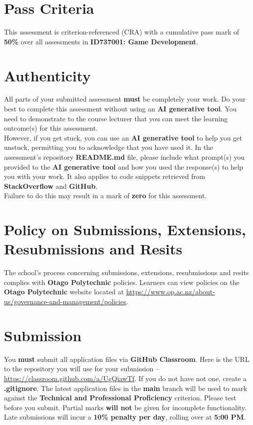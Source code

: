 \documentclass{article}
\begin{document}
\section*{Pass Criteria}
This assessment is criterion-referenced (CRA) with a cumulative pass mark of \textbf{50\%} over all assessments in \textbf{ID737001: Game Development}.

\section*{Authenticity}
All parts of your submitted assessment \textbf{must} be completely your work. Do your best to complete this assessment without using an \textbf{AI generative tool}. You need to demonstrate to the course lecturer that you can meet the learning outcome(s) for this assessment. \\
 
 However, if you get stuck, you can use an \textbf{AI generative tool} to help you get unstuck, permitting you to acknowledge that you have used it. In the assessment's repository \textbf{README.md} file, please include what prompt(s) you provided to the \textbf{AI generative tool} and how you used the response(s) to help you with your work. It also applies to code snippets retrieved from \textbf{StackOverflow} and \textbf{GitHub}. \\
 
 Failure to do this may result in a mark of \textbf{zero} for this assessment.

\section*{Policy on Submissions, Extensions, Resubmissions and Resits}
The school's process concerning submissions, extensions, resubmissions and resits complies with \textbf{Otago Polytechnic} policies. Learners can view policies on the \textbf{Otago Polytechnic} website located at \href{https://www.op.ac.nz/about-us/governance-and-management/policies}{https://www.op.ac.nz/about-us/governance-and-management/policies}.

\section*{Submission}
You \textbf{must} submit all application files via \textbf{GitHub Classroom}. Here is the URL to the repository you will use for your submission – \href{https://classroom.github.com/a/UgQiawTf}{https://classroom.github.com/a/UgQiawTf}. If you do not have not one, create a \textbf{.gitignore}. The latest application files in the \textbf{main} branch will be used to mark against the \textbf{Technical and Professional Proficiency} criterion. Please test before you submit. Partial marks \textbf{will not} be given for incomplete functionality. Late submissions will incur a \textbf{10\% penalty per day}, rolling over at \textbf{5:00 PM}.
\end{document}
